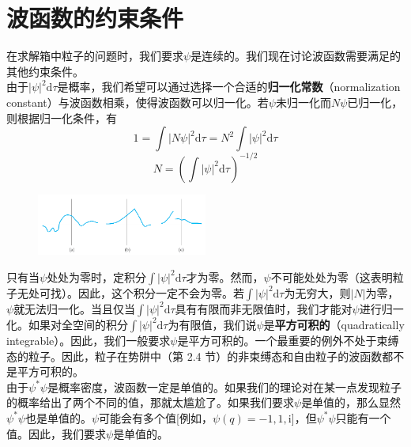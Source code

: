 \section{波函数的约束条件}
	在求解箱中粒子的问题时，我们要求$\psi$是连续的。我们现在讨论波函数需要满足的其他约束条件。\\
	\indent 由于$\left|\psi\right|^2\mathrm{d}\tau$是概率，我们希望可以通过选择一个合适的\textbf{归一化常数}（normalization constant）与波函数相乘，使得波函数可以归一化。若$\psi$未归一化而$N\psi$已归一化，则根据归一化条件，有
	\begin{equation}
		1 = \int \left|N\psi\right|^2\mathrm{d}\tau = N^2\int \left|\psi\right|^2\mathrm{d}\tau
		\label{eq:3.93}
	\end{equation}
	\begin{equation*}
		N = \left(\int \left|\psi\right|^2\mathrm{d}\tau\right)^{-1/2}
	\end{equation*}
	\begin{figure}[h!]
		\centering
		\includegraphics[width=0.5\textwidth]{Figures/3.4.png}  %
		\caption{}
		\vspace{-6pt}
		\label{fig:3.4}
	\end{figure}
	只有当$\psi$处处为零时，定积分$\int \left|\psi\right|^2\mathrm{d}\tau$才为零。然而，$\psi$不可能处处为零（这表明粒子无处可找）。因此，这个积分一定不会为零。若$\int \left|\psi\right|^2\mathrm{d}\tau$为无穷大，则$\left|N\right|$为零，$\psi$就无法归一化。当且仅当$\int \left|\psi\right|^2\mathrm{d}\tau$具有有限而非无限值时，我们才能对$\psi$进行归一化。如果对全空间的积分$\int \left|\psi\right|^2\mathrm{d}\tau$为有限值，我们说$\psi$是\textbf{平方可积的}（quadratically integrable）。因此，我们一般要求$\psi$是平方可积的。一个最重要的例外不处于束缚态的粒子。因此，粒子在势阱中（第 2.4 节）的非束缚态和自由粒子的波函数都不是平方可积的。\\
	\indent 由于$\psi^{\ast}\psi$是概率密度，波函数一定是单值的。如果我们的理论对在某一点发现粒子的概率给出了两个不同的值，那就太尴尬了。如果我们要求$\psi$是单值的，那么显然$\psi^{\ast}\psi$也是单值的。$\psi$可能会有多个值[例如，$\psi\left(q\right) = -1,1,\mathrm{i}$]，但$\psi^{\ast}\psi$只能有一个值。因此，我们要求$\psi$是单值的。\\
